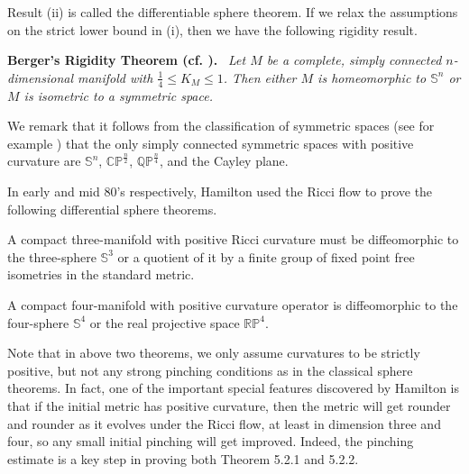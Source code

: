 \medskip
Result (ii) is called the differentiable sphere theorem. If we
relax the assumptions on the strict lower bound in (i), then we
have the following rigidity result.

\medskip
{\bf Berger's Rigidity Theorem (cf. \cite{CE}).} \emph{ \ Let $M$ be a complete, simply connected
$n$-dimensional manifold with $\frac{1}{4}\le K_M\leq 1$. Then
either $M$ is homeomorphic to $\mathbb{S}^n$ or $M$ is isometric
to a symmetric space.}

\medskip
We remark that it follows from the classification of symmetric
spaces (see for example \cite{He}) that the only simply connected
symmetric spaces with positive curvature are $\mathbb{S}^n$,
$\mathbb{CP}^\frac{n}{2}$, $\mathbb{QP}^\frac{n}{4}$, and the
Cayley plane.

In early and mid 80's respectively, Hamilton \cite{Ha82, Ha86}
used the Ricci flow to prove the following differential sphere
theorems.

\begin{theorem}
  \label{thm:cz-three-manifold-positive-ricci-sphere}

A compact three-manifold with positive Ricci curvature must be
diffeomorphic to the three-sphere $\mathbb{S}^3$ or a quotient of
it by a finite group of fixed point free isometries in the
standard metric.
\end{theorem}

\begin{theorem}
  \label{thm:cz-four-manifold-positive-curvature-operator-sphere}

A compact four-manifold with positive curvature operator is
diffeomorphic to the four-sphere $\mathbb{S}^4$ or the real
projective space $\mathbb{RP}^4$.
\end{theorem}

Note that in above two theorems, we only assume curvatures to be
strictly positive, but not any strong pinching conditions as in
the classical sphere theorems. In fact, one of the important
special features discovered by Hamilton is that if the initial
metric has positive curvature, then the metric will get rounder
and rounder as it evolves under the Ricci flow, at least in
dimension three and four, so any small initial pinching will get
improved. Indeed, the pinching estimate is a key step in proving
both Theorem 5.2.1 and 5.2.2.

